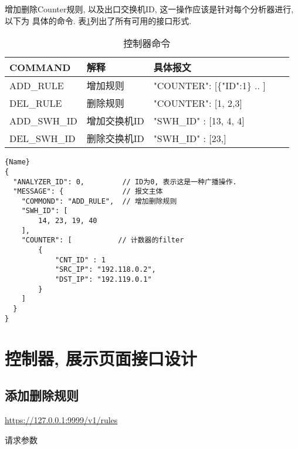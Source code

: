 增加删除Counter规则, 以及出口交换机ID, 这一操作应该是针对每个分析器进行, 以下为
具体的命令. 表\ref{tbl:message}列出了所有可用的接口形式.


\begin{table}[]
    \centering
    \caption{控制器命令}
    \label{tbl:message}
    \begin{tabular}{lllll} \hline
    COMMAND      & 解释         & 具体报文                         \\ \hline
    ADD\_RULE    & 增加规则     & "COUNTER": {[}\{"ID":1\} .. {]}  \\
    DEL\_RULE    & 删除规则     & "COUNTER": {[}1, 2,3{]}          \\
    ADD\_SWH\_ID & 增加交换机ID & "SWH\_ID" : {[}13, 4, 4{]}       \\
    DEL\_SWH\_ID & 删除交换机ID & "SWH\_ID" : {[}23,{]}            \\ \hline
    \end{tabular}
\end{table}

\begin{lstlisting}[caption=控制器增加删除规则]{Name}
{
  "ANALYZER_ID": 0,         // ID为0, 表示这是一种广播操作.
  "MESSAGE": {              // 报文主体
    "COMMOND": "ADD_RULE",  // 增加删除规则
    "SWH_ID": [
        14, 23, 19, 40
    ],
    "COUNTER": [           // 计数器的filter
        {
            "CNT_ID" : 1
            "SRC_IP": "192.118.0.2",
            "DST_IP": "192.119.0.1"
        }
    ]
  }
}
\end{lstlisting}

\section{控制器, 展示页面接口设计}

\subsection{添加删除规则}

\url{https://127.0.0.1:9999/v1/rules}

请求参数

